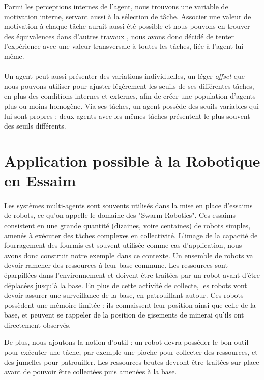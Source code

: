 		Parmi les perceptions internes de l'agent, nous trouvons une variable de motivation interne, servant aussi à la sélection de tâche. Associer une valeur de motivation à chaque tâche aurait aussi été possible et nous pouvons en trouver des équivalences dans d'autres travaux \cite{agassounon_scalable_2001}, nous avons donc décidé de tenter l'expérience avec une valeur transversale à toutes les tâches, liée à l'agent lui même.
		
		\paragraph{}
		Un agent peut aussi présenter des variations individuelles, un léger \textit{offset} que nous pouvons utiliser pour ajuster légèrement les seuils de ses différentes tâches, en plus des conditions internes et externes, afin de créer une population d'agents plus ou moins homogène. Via ses tâches, un agent possède des seuils variables qui lui sont propres : deux agents avec les mêmes tâches présentent le plus souvent des seuils différents.
		
	\section{Application possible à la Robotique en Essaim}
	
		\paragraph{}
			Les systèmes multi-agents sont souvents utilisés dans la mise en place d'essaims de robots, ce qu'on appelle le domaine des "Swarm Robotics". Ces essaims consistent en une grande quantité (dizaines, voire centaines) de robots simples, amenés à exécuter des tâches complexes en collectivité. L'image de la capacité de fourragement des fourmis est souvent utilisée comme cas d'application, nous avons donc construit notre exemple dans ce contexte. Un ensemble de robots va devoir ramener des ressources à leur base commune. Les ressources sont éparpillées dans l'environnement et doivent être traitées par un robot avant d'être déplacées jusqu'à la base. En plus de cette activité de collecte, les robots vont devoir assurer une surveillance de la base, en patrouillant autour. Ces robots possèdent une mémoire limitée : ils connaissent leur position ainsi que celle de la base, et peuvent se rappeler de la position de gisements de minerai qu'ils ont directement observés.
			
		De plus, nous ajoutons la notion d'outil : un robot devra posséder le bon outil pour exécuter une tâche, par exemple une pioche pour collecter des ressources, et des jumelles pour patrouiller. Les ressources brutes devront être traitées sur place avant de pouvoir être collectées puis amenées à la base.

